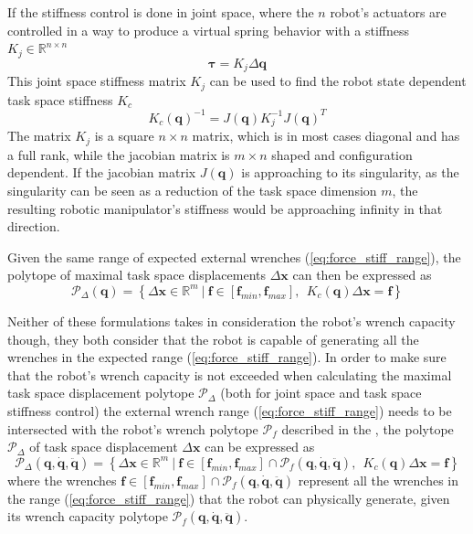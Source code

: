 If the stiffness control is done in joint space, where the $n$ robot's actuators are controlled in a way to produce a virtual spring behavior with a stiffness $K_j\in \mathbb{R}^{n\times n}$
\begin{equation}
    \bm{\tau} = K_j \Delta\bm{q}
\end{equation}
This joint space stiffness matrix $K_j$ can be used to find the robot state dependent task space stiffness $K_c$ \cite{Salisbury1980}
\begin{equation}
     K_c(\bm{q})^{-1} = J(\bm{q}) K_j^{-1}J(\bm{q})^T
     \label{eq:stiffness_roobt_eef}
\end{equation}
The matrix $K_j$ is a square $n \times n$ matrix, which is in most cases diagonal and has a full rank, while the jacobian matrix is $m\times n$ shaped and configuration dependent. If the jacobian matrix $J(\bm{q})$ is approaching to its singularity, as the singularity can be seen as a reduction of the task space dimension $m$, the resulting robotic manipulator's stiffness would be approaching infinity in that direction. 

Given the same range of expected external wrenches (\ref{eq:force_stiff_range}), the polytope of maximal task space displacements $\Delta\bm{x}$ can then be expressed as
\begin{equation}
    \mathcal{P}_\Delta(\bm{q}) = \left\{ \Delta\bm{x} \in \mathbb{R}^m ~|~ \bm{f}\in\left[\bm{f}_{min}, \bm{f}_{max} \right], ~~ K_c(\bm{q})\Delta\bm{x} = \bm{f} \right\}
\end{equation}


Neither of these formulations takes in consideration the robot's wrench capacity though, they both consider that the robot is capable of generating all the wrenches in the expected range (\ref{eq:force_stiff_range}). 
In order to make sure that the robot's wrench capacity is not exceeded when calculating the maximal task space displacement polytope $\mathcal{P}_\Delta$ (both for joint space and task space stiffness control) the external wrench range (\ref{eq:force_stiff_range}) needs to be intersected with the robot's  wrench polytope  $\mathcal{P}_f$ described in the , the polytope $\mathcal{P}_\Delta$ of task space displacement $\Delta \bm{x}$ can be expressed as
\begin{equation}
    \mathcal{P}_\Delta(\bm{q},\dot{\bm{q}},\ddot{\bm{q}}) = \left\{ \Delta\bm{x} \in \mathbb{R}^m ~|~ \bm{f}\in \left[\bm{f}_{min}, \bm{f}_{max} \right] \cap \mathcal{P}_f(\bm{q},\dot{\bm{q}},\ddot{\bm{q}}),  ~~  K_c(\bm{q})\Delta\bm{x}=\bm{f}\right\}
\end{equation}
where the wrenches $\bm{f}\in \left[\bm{f}_{min}, \bm{f}_{max} \right] \cap \mathcal{P}_f(\bm{q},\dot{\bm{q}},\ddot{\bm{q}})$ represent all the wrenches in the range (\ref{eq:force_stiff_range}) that the robot can physically generate, given its wrench capacity polytope $\mathcal{P}_f(\bm{q},\dot{\bm{q}},\ddot{\bm{q}})$.

